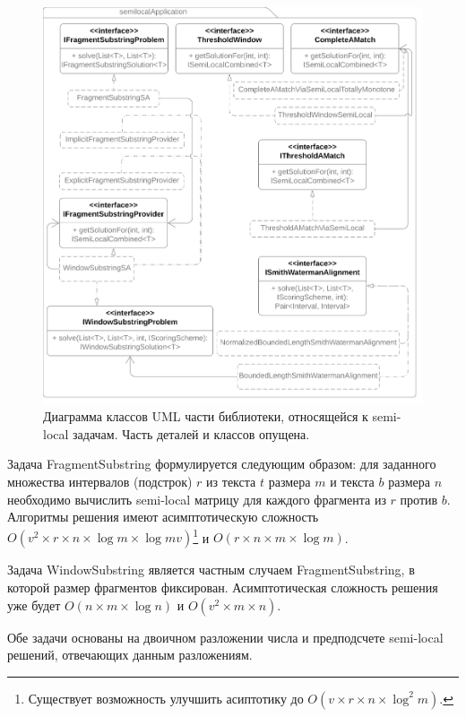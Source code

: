 \begin{figure}
    \centering
    \includegraphics[width=1.0\columnwidth,angle=0]{Mishin/figures/semiLocalApplication.png}
    \caption{Диаграмма классов UML части библиотеки, относящейся к semi-local задачам. Часть деталей и классов опущена.}\label{fig:libraryApplication}
\end{figure}

Задача FragmentSubstring формулируется следующим образом: для заданного множества интервалов (подстрок) $r$ из текста $t$ размера $m$ и текста $b$ размера $n$ необходимо вычислить semi-local матрицу для каждого фрагмента из $r$ против $b$.
Алгоритмы решения имеют асимптотическую сложность $O(v^2 \times r \times  n \times \log m \times \log mv)$\footnote{Существует возможность улучшить асиптотику до $O(v \times r \times  n \times \log^{2} m)$.} и $O(r \times n \times m  \times \log m)$.

Задача WindowSubstring является частным случаем  FragmentSubstring, в которой размер фрагментов фиксирован.
Асимптотическая сложность решения уже будет $O(n \times m \times \log n)$ и $O(v^2 \times  m \times n)$.

Обе задачи основаны на двоичном разложении числа и предподсчете semi-local решений, отвечающих данным разложениям.

